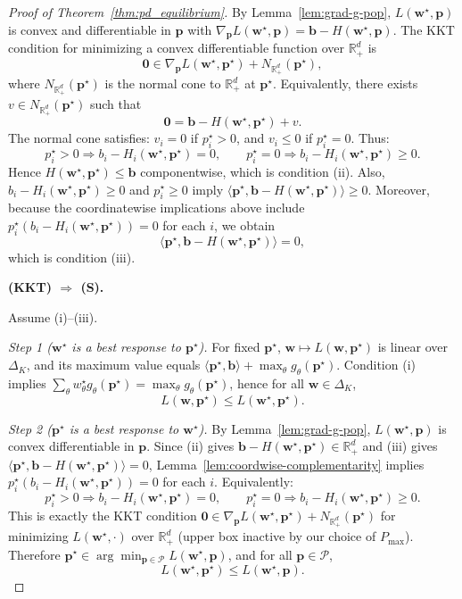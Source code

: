 \documentclass[11pt]{article}
\newcommand{\bb}{\mathbf{b}}
\newcommand{\bp}{\mathbf{p}}
\newcommand{\bw}{\mathbf{w}}
\newcommand{\R}{\mathbb{R}}
\newcommand{\cP}{\mathcal{P}}
\begin{document}
\begin{proof}[Proof of Theorem~\ref{thm:pd_equilibrium}]
By Lemma~\ref{lem:grad-g-pop}, $L(\bw^\star, \bp)$ is convex and differentiable in $\bp$ with $\nabla_\bp L(\bw^\star, \bp) = \bb - H(\bw^\star, \bp)$. The KKT condition for minimizing a convex differentiable function over $\R_+^d$ is
\[
\mathbf{0} \in \nabla_\bp L(\bw^\star, \bp^\star) + N_{\R_+^d}(\bp^\star),
\]
where $N_{\R_+^d}(\bp^\star)$ is the normal cone to $\R_+^d$ at $\bp^\star$.
Equivalently, there exists $v \in N_{\R_+^d}(\bp^\star)$ such that
\[
\mathbf{0} = \bb - H(\bw^\star, \bp^\star) + v.
\]
The normal cone satisfies: $v_i = 0$ if $p_i^\star > 0$, and $v_i \le 0$ if $p_i^\star = 0$.
Thus:
\[
p_i^\star > 0 \Rightarrow b_i - H_i(\bw^\star, \bp^\star) = 0, \qquad p_i^\star = 0 \Rightarrow b_i - H_i(\bw^\star, \bp^\star) \ge 0.
\]
Hence $H(\bw^\star, \bp^\star) \le \bb$ componentwise, which is condition (ii). Also, $b_i - H_i(\bw^\star, \bp^\star) \ge 0$ and $p_i^\star \ge 0$ imply $\langle \bp^\star, \bb - H(\bw^\star, \bp^\star) \rangle \ge 0$. Moreover, because the coordinatewise implications above include $p_i^\star(b_i - H_i(\bw^\star, \bp^\star)) = 0$ for each $i$, we obtain
\[
\langle \bp^\star, \bb - H(\bw^\star, \bp^\star) \rangle = 0,
\]
which is condition (iii).

\textbf{(KKT) $\Rightarrow$ (S).}

Assume (i)--(iii).

\emph{Step 1 ($\bw^\star$ is a best response to $\bp^\star$).}
For fixed $\bp^\star$, $\bw \mapsto L(\bw, \bp^\star)$ is linear over $\Delta_K$, and its maximum value equals $\langle \bp^\star, \bb \rangle + \max_{\theta} g_\theta(\bp^\star)$.
Condition (i) implies $\sum_\theta w_\theta^\star g_\theta(\bp^\star) = \max_{\theta} g_\theta(\bp^\star)$, hence for all $\bw \in \Delta_K$,
\[
L(\bw, \bp^\star) \le L(\bw^\star, \bp^\star).
\]

\emph{Step 2 ($\bp^\star$ is a best response to $\bw^\star$).}
By Lemma~\ref{lem:grad-g-pop}, $L(\bw^\star, \bp)$ is convex differentiable in $\bp$.
Since (ii) gives $\bb - H(\bw^\star, \bp^\star) \in \R_+^d$ and (iii) gives $\langle \bp^\star, \bb - H(\bw^\star, \bp^\star) \rangle = 0$, Lemma~\ref{lem:coordwise-complementarity} implies $p_i^\star(b_i - H_i(\bw^\star, \bp^\star)) = 0$ for each $i$.
Equivalently:
\[
p_i^\star > 0 \Rightarrow b_i - H_i(\bw^\star, \bp^\star) = 0, \qquad p_i^\star = 0 \Rightarrow b_i - H_i(\bw^\star, \bp^\star) \ge 0.
\]
This is exactly the KKT condition $\mathbf{0} \in \nabla_\bp L(\bw^\star, \bp^\star) + N_{\R_+^d}(\bp^\star)$ for minimizing $L(\bw^\star, \cdot)$ over $\R_+^d$ (upper box inactive by our choice of $P_{\max}$).
Therefore $\bp^\star \in \arg\min_{\bp \in \cP} L(\bw^\star, \bp)$, and for all $\bp \in \cP$,
\[
L(\bw^\star, \bp^\star) \le L(\bw^\star, \bp).
\]


\end{proof}
\end{document}
